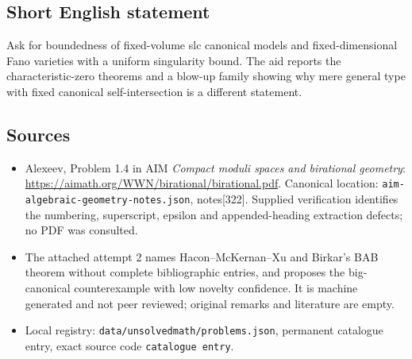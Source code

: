 \documentclass[11pt]{article}
\begin{document}
\subsection{Short English statement}
Ask for boundedness of fixed-volume slc canonical models and fixed-dimensional Fano varieties with a uniform singularity bound. The aid reports the characteristic-zero theorems and a blow-up family showing why mere general type with fixed canonical self-intersection is a different statement.
\subsection{Sources}
\begin{itemize}
\item Alexeev, Problem 1.4 in AIM \emph{Compact moduli spaces and birational geometry}: \url{https://aimath.org/WWN/birational/birational.pdf}. Canonical location: \texttt{aim-algebraic-geometry-notes.json}, notes[322]. Supplied verification identifies the numbering, superscript, epsilon and appended-heading extraction defects; no PDF was consulted.
\item The attached attempt 2 names Hacon--McKernan--Xu and Birkar's BAB theorem without complete bibliographic entries, and proposes the big-canonical counterexample with low novelty confidence. It is machine generated and not peer reviewed; original remarks and literature are empty.
\item Local registry: \texttt{data/unsolvedmath/problems.json}, permanent catalogue entry, exact source code \texttt{catalogue entry}.
\end{itemize}
\end{document}
